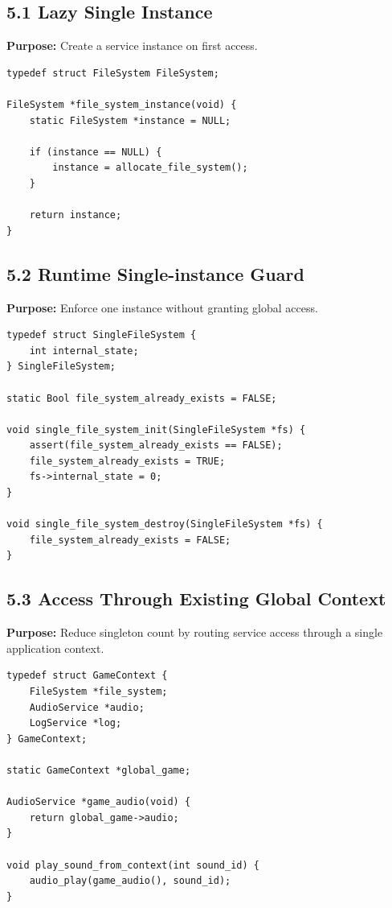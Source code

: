 \documentclass[10pt,letterpaper]{article}
\begin{document}
\subsection{5.1 Lazy Single Instance}

\textbf{Purpose:} Create a service instance on first access.

\begin{verbatim}
typedef struct FileSystem FileSystem;

FileSystem *file_system_instance(void) {
    static FileSystem *instance = NULL;

    if (instance == NULL) {
        instance = allocate_file_system();
    }

    return instance;
}
\end{verbatim}

\subsection{5.2 Runtime Single-instance Guard}

\textbf{Purpose:} Enforce one instance without granting global access.

\begin{verbatim}
typedef struct SingleFileSystem {
    int internal_state;
} SingleFileSystem;

static Bool file_system_already_exists = FALSE;

void single_file_system_init(SingleFileSystem *fs) {
    assert(file_system_already_exists == FALSE);
    file_system_already_exists = TRUE;
    fs->internal_state = 0;
}

void single_file_system_destroy(SingleFileSystem *fs) {
    file_system_already_exists = FALSE;
}
\end{verbatim}

\subsection{5.3 Access Through Existing Global Context}

\textbf{Purpose:} Reduce singleton count by routing service access through a single application context.

\begin{verbatim}
typedef struct GameContext {
    FileSystem *file_system;
    AudioService *audio;
    LogService *log;
} GameContext;

static GameContext *global_game;

AudioService *game_audio(void) {
    return global_game->audio;
}

void play_sound_from_context(int sound_id) {
    audio_play(game_audio(), sound_id);
}
\end{verbatim}
\end{document}
